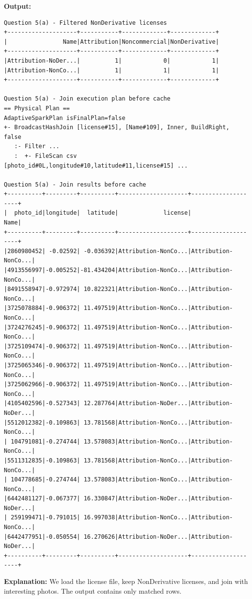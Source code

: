 \documentclass[11pt]{article}
\begin{document}
\textbf{Output:}
\begin{lstlisting}
Question 5(a) - Filtered NonDerivative licenses
+--------------------+-----------+-------------+-------------+
|                Name|Attribution|Noncommercial|NonDerivative|
+--------------------+-----------+-------------+-------------+
|Attribution-NoDer...|          1|            0|            1|
|Attribution-NonCo...|          1|            1|            1|
+--------------------+-----------+-------------+-------------+

Question 5(a) - Join execution plan before cache
== Physical Plan ==
AdaptiveSparkPlan isFinalPlan=false
+- BroadcastHashJoin [license#15], [Name#109], Inner, BuildRight, false
   :- Filter ...
   :  +- FileScan csv [photo_id#0L,longitude#10,latitude#11,license#15] ...

Question 5(a) - Join results before cache
+----------+---------+----------+--------------------+--------------------+
|  photo_id|longitude|  latitude|             license|                Name|
+----------+---------+----------+--------------------+--------------------+
|2860980452| -0.02592| -0.036392|Attribution-NonCo...|Attribution-NonCo...|
|4913556997|-0.005252|-81.434204|Attribution-NonCo...|Attribution-NonCo...|
|8491558947|-0.972974| 10.822321|Attribution-NonCo...|Attribution-NonCo...|
|3725078884|-0.906372| 11.497519|Attribution-NonCo...|Attribution-NonCo...|
|3724276245|-0.906372| 11.497519|Attribution-NonCo...|Attribution-NonCo...|
|3725109474|-0.906372| 11.497519|Attribution-NonCo...|Attribution-NonCo...|
|3725065346|-0.906372| 11.497519|Attribution-NonCo...|Attribution-NonCo...|
|3725062966|-0.906372| 11.497519|Attribution-NonCo...|Attribution-NonCo...|
|4105402596|-0.527343| 12.287764|Attribution-NoDer...|Attribution-NoDer...|
|5512012382|-0.109863| 13.781568|Attribution-NonCo...|Attribution-NonCo...|
| 104791081|-0.274744| 13.578083|Attribution-NonCo...|Attribution-NonCo...|
|5511312835|-0.109863| 13.781568|Attribution-NonCo...|Attribution-NonCo...|
| 104778685|-0.274744| 13.578083|Attribution-NonCo...|Attribution-NonCo...|
|6442481127|-0.067377| 16.330847|Attribution-NoDer...|Attribution-NoDer...|
| 259199471|-0.791015| 16.997038|Attribution-NonCo...|Attribution-NonCo...|
|6442477951|-0.050554| 16.270626|Attribution-NoDer...|Attribution-NoDer...|
+----------+---------+----------+--------------------+--------------------+
\end{lstlisting}

\textbf{Explanation:} We load the license file, keep NonDerivative licenses, and join with interesting photos. The output contains only matched rows.
\end{document}

